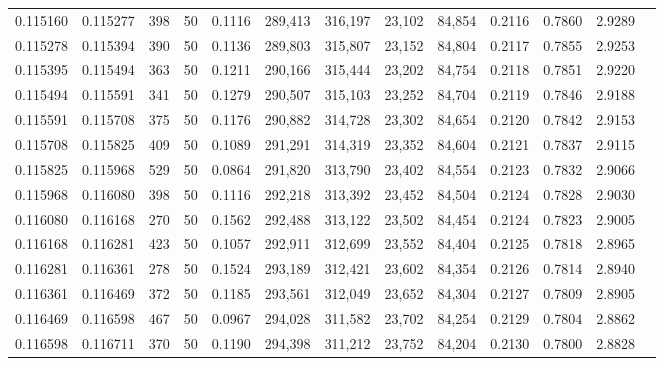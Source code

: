 \begin{tabular}{rrrrrrrrrrrrr}
0.115160 & 0.115277 &   398 &  50 &                                     0.1116 & 289,413 & 316,197 &  23,102 &  84,854 & 0.2116 & 0.7860 & 2.9289 \\
0.115278 & 0.115394 &   390 &  50 &                                     0.1136 & 289,803 & 315,807 &  23,152 &  84,804 & 0.2117 & 0.7855 & 2.9253 \\
0.115395 & 0.115494 &   363 &  50 &                                     0.1211 & 290,166 & 315,444 &  23,202 &  84,754 & 0.2118 & 0.7851 & 2.9220 \\
0.115494 & 0.115591 &   341 &  50 &                                     0.1279 & 290,507 & 315,103 &  23,252 &  84,704 & 0.2119 & 0.7846 & 2.9188 \\
0.115591 & 0.115708 &   375 &  50 &                                     0.1176 & 290,882 & 314,728 &  23,302 &  84,654 & 0.2120 & 0.7842 & 2.9153 \\
0.115708 & 0.115825 &   409 &  50 &                                     0.1089 & 291,291 & 314,319 &  23,352 &  84,604 & 0.2121 & 0.7837 & 2.9115 \\
0.115825 & 0.115968 &   529 &  50 &                                     0.0864 & 291,820 & 313,790 &  23,402 &  84,554 & 0.2123 & 0.7832 & 2.9066 \\
0.115968 & 0.116080 &   398 &  50 &                                     0.1116 & 292,218 & 313,392 &  23,452 &  84,504 & 0.2124 & 0.7828 & 2.9030 \\
0.116080 & 0.116168 &   270 &  50 &                                     0.1562 & 292,488 & 313,122 &  23,502 &  84,454 & 0.2124 & 0.7823 & 2.9005 \\
0.116168 & 0.116281 &   423 &  50 &                                     0.1057 & 292,911 & 312,699 &  23,552 &  84,404 & 0.2125 & 0.7818 & 2.8965 \\
0.116281 & 0.116361 &   278 &  50 &                                     0.1524 & 293,189 & 312,421 &  23,602 &  84,354 & 0.2126 & 0.7814 & 2.8940 \\
0.116361 & 0.116469 &   372 &  50 &                                     0.1185 & 293,561 & 312,049 &  23,652 &  84,304 & 0.2127 & 0.7809 & 2.8905 \\
0.116469 & 0.116598 &   467 &  50 &                                     0.0967 & 294,028 & 311,582 &  23,702 &  84,254 & 0.2129 & 0.7804 & 2.8862 \\
0.116598 & 0.116711 &   370 &  50 &                                     0.1190 & 294,398 & 311,212 &  23,752 &  84,204 & 0.2130 & 0.7800 & 2.8828 \\

\end{tabular}
